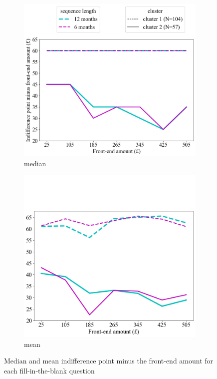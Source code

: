 \documentclass[
  12pt,
]{article}
\begin{document}
\begin{figure}
    \centering
    \begin{subfigure}{0.51\textwidth}
        \centering
        \includegraphics[width=\linewidth]{figures/exp2_cluster_result_median.png} 
        \caption{median}
    \end{subfigure}
    \hfill
    \begin{subfigure}{0.48\textwidth}
        \centering
        \includegraphics[width=\linewidth]{figures/exp2_cluster_result_mean.png}
        \caption{mean}
    \end{subfigure}
    \caption{Median and mean indifference point minus the front-end amount for each fill-in-the-blank question}
    \label{fig:exp2_cluster}
\end{figure}
\end{document}
